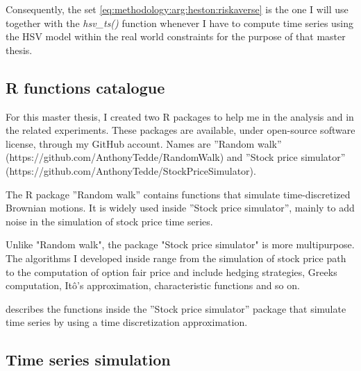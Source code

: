 \documentclass[12pt]{report}
\begin{document}
Consequently, the set \ref{eq:methodology:arg:heston:riskaverse} is the one I will use together with the \textit{hsv\_ts()} function whenever I have to compute time series using the HSV model within the real world constraints for the purpose of that master thesis.


















\begin{appendices}
\chapter{R functions catalogue}
\label{cha:r}


For this master thesis, I created two R packages to help me in the analysis and in the related experiments. These packages are available, under open-source software license, through my GitHub account. Names are ”Random walk”  (https://github.com/AnthonyTedde/RandomWalk) and ”Stock price simulator” (https://github.com/AnthonyTedde/StockPriceSimulator).

The R package ”Random walk” contains functions that simulate time-discretized Brownian motions. It is widely used inside ”Stock price simulator”, mainly to add noise in the simulation of stock price time series. 

Unlike "Random walk", the package "Stock price simulator" is more multipurpose. The algorithms I developed inside range from the simulation of stock price path to the computation of option fair price and include hedging strategies, Greeks computation, Itô's approximation, characteristic functions and so on.

 describes the functions inside the ”Stock price simulator” package that simulate time series by using a time discretization approximation.

\section{Time series simulation}
\label{sec:r:time}






\end{appendices}
\end{document}
